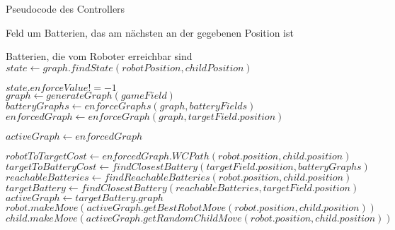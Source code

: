 \begin{algorithm}[H]
	\caption{Pseudocode des Controllers}\label{alg:controllerPseudo}
	\begin{algorithmic}[1]
		
		\Return Feld um Batterien, das am nächsten an der gegebenen Position ist
		\EndProcedure
		\\
		
		\Return Batterien, die vom Roboter erreichbar sind
		\EndProcedure
		\\
			\State $state \gets graph.findState(robotPosition, childPosition)$
			
			\Return $state.enforceValue != -1$
		\EndProcedure
		\\
		
			\State $graph \gets generateGraph(gameField)$
			\State $batteryGraphs \gets enforceGraphs(graph, batteryFields)$
			\\
					\State $enforcedGraph \gets enforceGraph(graph, targetField.position)$ 
					
					\State $activeGraph \gets enforcedGraph$
					\\
					
					\State $robotToTargetCost \gets enforcedGraph.WCPath(robot.position, child.position)$
					\State $targetToBatteryCost \gets findClosestBattery(targetField.position, batteryGraphs)$
					\\
						\State $reachableBatteries \gets findReachableBatteries(robot.position, child.position)$
						\State $targetBattery \gets findClosestBattery(reachableBatteries, targetField.position)$
						\State $activeGraph \gets targetBattery.graph$
					\EndIf
					\\
					\State $robot.makeMove(activeGraph.getBestRobotMove(robot.position, child.position))$
					\State $child.makeMove(activeGraph.getRandomChildMove(robot.position, child.position))$
					
					\EndWhile
				\EndFor
			\EndWhile
		\EndProcedure
	\end{algorithmic}
\end{algorithm}

